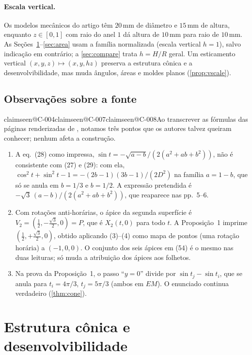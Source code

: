 \documentclass[11pt,a4paper]{article}
\makeatletter
\theoremstyle{plain}
\theoremstyle{remark}
\newcommand{\claim}[1]{\ifcsname claimseen@#1\endcsname\else\expandafter\gdef\csname claimseen@#1\endcsname{}\label{claim:#1}\fi}
\makeatother
\begin{document}
\paragraph{Escala vertical.} Os modelos mecânicos do artigo têm $20$\,mm de diâmetro e $15$\,mm de altura, enquanto
$z\in[0,1]$ com raio do anel $1$ dá altura de $10$\,mm para raio de $10$\,mm. As Seções~\ref{sec:cones}--\ref{sec:area}
usam a família normalizada (escala vertical $h=1$), salvo indicação em contrário; a \cref{sec:compare} trata $h=H/R$ geral.
Um esticamento vertical $(x,y,z)\mapsto(x,y,hz)$ preserva a estrutura cônica e a desenvolvibilidade, mas muda ângulos, áreas
e moldes planos (\cref{prop:vscale}).

\subsection{Observações sobre a fonte}\label{sec:source}
\claim{C-004}\claim{C-007}\claim{C-008}Ao transcrever as fórmulas das páginas renderizadas de \citet{McKee2026}, notamos três
pontos que os autores talvez queiram conhecer; nenhum afeta a construção.
\begin{enumerate}
\item A eq.~(28) como impressa, $\sin t=-\sqrt{a-b}/(2(a^2+ab+b^2))$, não é consistente com (27) e (29): com ela,
  $\cos^2t+\sin^2t-1=-(2b-1)(3b-1)/(2D^2)$ na família $a=1-b$, que só se anula em $b=1/3$ e $b=1/2$. A expressão pretendida
  é $-\sqrt3\,(a-b)/(2(a^2+ab+b^2))$, que reaparece nas pp.~5--6.
\item Com rotações anti-horárias, o ápice da segunda superfície é $V_2=(\tfrac12,-\tfrac{\sqrt3}{2},0)=P$, que é $X_2(t,0)$
  para todo $t$. A Proposição~1 imprime $(\tfrac12,+\tfrac{\sqrt3}{2},0)$, obtido aplicando (3)--(4) como mapa de pontos (uma
  rotação horária) a $(-1,0,0)$. O conjunto dos seis ápices em (54) é o mesmo nas duas leituras; só muda a atribuição dos
  ápices aos folhetos.
\item Na prova da Proposição~1, o passo ``$y=0$'' divide por $\sin t_j-\sin t_i$, que se anula para $t_i=4\pi/3$,
  $t_j=5\pi/3$ (ambos em $EM$). O enunciado continua verdadeiro (\cref{thm:cone}).
\end{enumerate}

\section{Estrutura cônica e desenvolvibilidade}\label{sec:cones}
\end{document}
